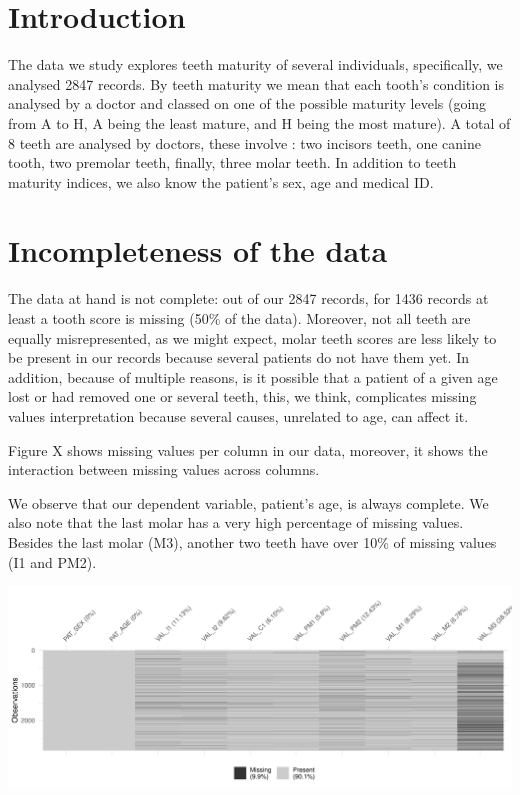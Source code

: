\documentclass[11pt,]{article}
\begin{document}
\vskip -8.5pt



\noindent  

\hypertarget{introduction}{%
\section{Introduction}\label{introduction}}

The data we study explores teeth maturity of several individuals,
specifically, we analysed 2847 records. By teeth maturity we mean that
each tooth's condition is analysed by a doctor and classed on one of the
possible maturity levels (going from A to H, A being the least mature,
and H being the most mature). A total of 8 teeth are analysed by
doctors, these involve : two incisors teeth, one canine tooth, two
premolar teeth, finally, three molar teeth. In addition to teeth
maturity indices, we also know the patient's sex, age and medical ID.

\hypertarget{incompleteness-of-the-data}{%
\section{Incompleteness of the data}\label{incompleteness-of-the-data}}

The data at hand is not complete: out of our 2847 records, for 1436
records at least a tooth score is missing (50\% of the data). Moreover,
not all teeth are equally misrepresented, as we might expect, molar
teeth scores are less likely to be present in our records because
several patients do not have them yet. In addition, because of multiple
reasons, is it possible that a patient of a given age lost or had
removed one or several teeth, this, we think, complicates missing values
interpretation because several causes, unrelated to age, can affect it.

Figure X shows missing values per column in our data, moreover, it shows
the interaction between missing values across columns.

We observe that our dependent variable, patient's age, is always
complete. We also note that the last molar has a very high percentage of
missing values. Besides the last molar (M3), another two teeth have over
10\% of missing values (I1 and PM2).

\includegraphics{paper_teeth_files/figure-latex/unnamed-chunk-3-1.pdf}
\end{document}
